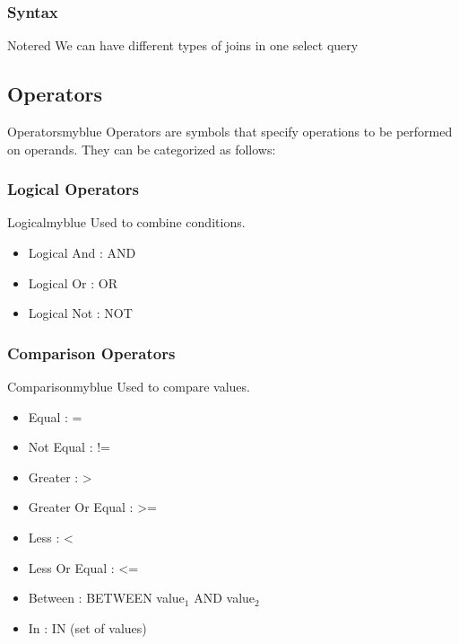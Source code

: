 \vspace{0.25cm}
\subsubsection*{ \textbf{Syntax}}



\vspace{0.25cm}
\begin{prettyBox}{Note}{red}
We can have different types of joins in one select query
\end{prettyBox}

\vspace{0.5cm}
\subsection{Operators}
\begin{prettyBox}{Operators}{myblue}
Operators are symbols that specify operations to be performed on operands. They can be categorized as follows:
\end{prettyBox}

\vspace{0.25cm}
\subsubsection{Logical Operators}
\begin{prettyBox}{Logical}{myblue}
Used to combine conditions.
          \begin{itemize} 
              \item Logical And : AND 
              \item Logical Or : OR 
              \item Logical Not : NOT 
              \end{itemize} 
\end{prettyBox}

\vspace{0.25cm}
\subsubsection{Comparison Operators}
\begin{prettyBox}{Comparison}{myblue}
Used to compare values.
    \begin{itemize}
             \item Equal : = 
             \item Not Equal : != 
             \item Greater : \textgreater
             \item Greater Or Equal : \textgreater= 
             \item Less : \textless
             \item Less Or Equal : \textless= 
             \item Between : BETWEEN value$_{1}$ AND value$_{2}$
             \item In : IN (set of values)
             \end{itemize} 
\end{prettyBox}

